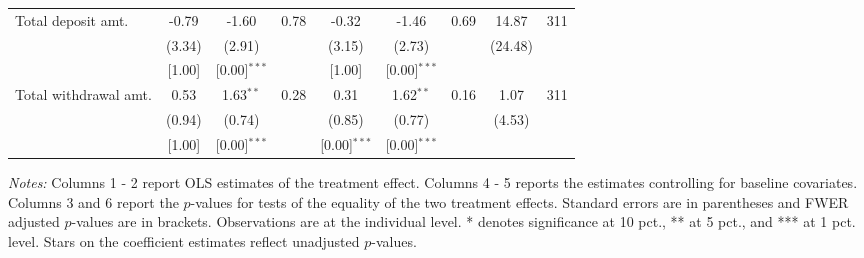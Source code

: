 \begin{table}[htbp]
{\begin{threeparttable}
\begin{tabular}{l*{8}{c}}
Total deposit amt.&    -0.79&    -1.60&     0.78&    -0.32&    -1.46&     0.69&    14.87&      311\\
          &   (3.34)&   (2.91)&         &   (3.15)&   (2.73)&         &  (24.48)&         \\
          &   [1.00]&[0.00]$^{***}$&         &   [1.00]&[0.00]$^{***}$&         &         &         \\
Total withdrawal amt.&     0.53&1.63$^{**}$&     0.28&     0.31&1.62$^{**}$&     0.16&     1.07&      311\\
          &   (0.94)&   (0.74)&         &   (0.85)&   (0.77)&         &   (4.53)&         \\
          &   [1.00]&[0.00]$^{***}$&         &[0.00]$^{***}$&[0.00]$^{***}$&         &         &         \\
\bottomrule \end{tabular} \begin{tablenotes}[flushleft] \footnotesize \item \emph{Notes:} Columns 1 - 2 report OLS estimates of the treatment effect. Columns 4 - 5 reports the estimates controlling for baseline covariates. Columns 3 and 6 report the \(p\)-values for tests of the equality of the two treatment effects. Standard errors are in parentheses and FWER adjusted \(p\)-values are in brackets. Observations are at the individual level. * denotes significance at 10 pct., ** at 5 pct., and *** at 1 pct. level. Stars on the coefficient estimates reflect unadjusted \(p\)-values. \end{tablenotes} \end{threeparttable} } \end{table}

